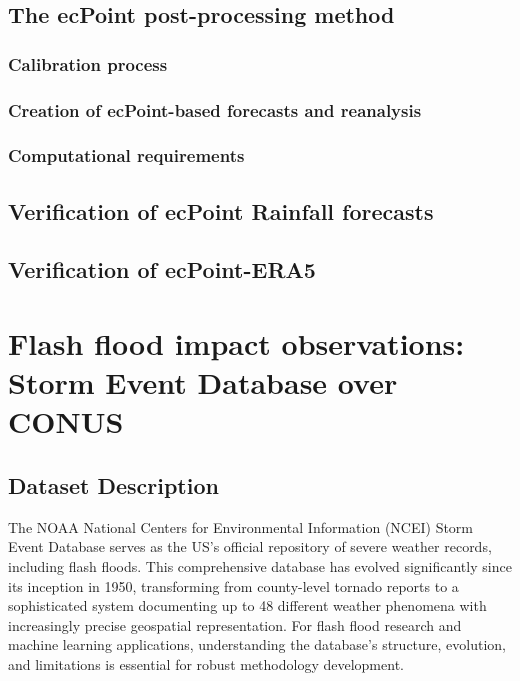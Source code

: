 \subsection{The ecPoint post-processing method}

\subsubsection{Calibration process}

\subsubsection{Creation of ecPoint-based forecasts and reanalysis}

\subsubsection{Computational requirements}


\subsection{Verification of ecPoint Rainfall forecasts}


\subsection{Verification of ecPoint-ERA5}



\section{Flash flood impact observations: Storm Event Database over CONUS}

\subsection{Dataset Description}

The NOAA National Centers for Environmental Information (NCEI) Storm Event Database serves as the US's official repository of severe weather records, including flash floods. This comprehensive database has evolved significantly since its inception in 1950, transforming from county-level tornado reports to a sophisticated system documenting up to 48 different weather phenomena with increasingly precise geospatial representation. For flash flood research and machine learning applications, understanding the database's structure, evolution, and limitations is essential for robust methodology development. 

